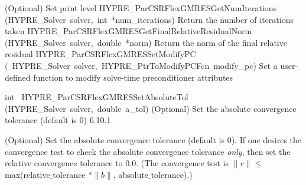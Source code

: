 \documentclass{article}
\begin{document}
\begin{cxxentry}
\begin{cxxentry}
\begin{cxxnames}
        {
(Optional) Set print level}
        {}
\label{cxx.6.10.12}
        {HYPRE\_ParCSRFlexGMRESGetNumIterations}
        {(HYPRE\_Solver\ solver,\ int\ *num\_iterations)}
        {
Return the number of iterations taken}
        {}
\label{cxx.6.10.13}
        {HYPRE\_ParCSRFlexGMRESGetFinalRelativeResidualNorm}
        {(HYPRE\_Solver\ solver,\ double\ *norm)}
        {
Return the norm of the final relative residual}
        {}
\label{cxx.6.10.14}
        {HYPRE\_ParCSRFlexGMRESSetModifyPC}
        {(\ HYPRE\_Solver\ solver,\ HYPRE\_PtrToModifyPCFcn\ modify\_pc)}
        {
Set a user-defined function to modify solve-time preconditioner attributes}
        {}
\label{cxx.6.10.15}
\end{cxxnames}
\begin{cxxfunction}
{int\ }
        {HYPRE\_ParCSRFlexGMRESSetAbsoluteTol}
        {(HYPRE\_Solver\ solver,\ double\ a\_tol)}
        {
(Optional) Set the absolute convergence tolerance (default is 0)}
        {6.10.1}
\begin{cxxdoc}

(Optional) Set the absolute convergence tolerance (default is 0). 
If one desires
the convergence test to check the absolute convergence tolerance {\it only}, then
set the relative convergence tolerance to 0.0.  (The convergence test is 
$\|r\| \leq$ max(relative$\_$tolerance $\ast \|b\|$, absolute$\_$tolerance).)


\end{cxxdoc}
\end{cxxfunction}
\end{cxxentry}
\end{cxxentry}
\end{document}
